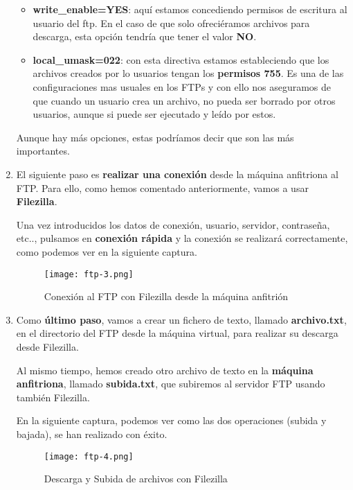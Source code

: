 \begin{enumerate}
\begin{itemize}
        \item \textbf{write\_enable=YES}: aquí estamos concediendo permisos de escritura al usuario del ftp. En el caso de que solo ofreciéramos archivos para descarga, esta opción tendría que tener el valor \textbf{NO}.

        \item \textbf{local\_umask=022}: con esta directiva estamos estableciendo que los archivos creados por lo usuarios tengan los \textbf{permisos 755}. Es una de las configuraciones mas usuales en los FTPs y con ello nos aseguramos de que cuando un usuario crea un archivo, no pueda ser borrado por otros usuarios, aunque si puede ser ejecutado y leído por estos.
    \end{itemize}

    Aunque hay más opciones, estas podríamos decir que son las más importantes.

    \item El siguiente paso es \textbf{realizar una conexión} desde la máquina anfitriona al FTP. Para ello, como hemos comentado anteriormente, vamos a usar \textbf{Filezilla}.

    Una vez introducidos los datos de conexión, usuario, servidor, contraseña, etc.., pulsamos en \textbf{conexión rápida} y la conexión se realizará correctamente, como podemos ver en la siguiente captura.

    \begin{figure}[H]
        \centering
        \texttt{[image: ftp-3.png]}
        \caption{Conexión al FTP con Filezilla desde la máquina anfitrión}
    \end{figure}

    \item Como \textbf{último paso}, vamos a crear un fichero de texto, llamado \textbf{archivo.txt}, en el directorio del FTP desde la máquina virtual, para realizar su descarga desde Filezilla.

    Al mismo tiempo, hemos creado otro archivo de texto en la \textbf{máquina anfitriona}, llamado \textbf{subida.txt}, que subiremos al servidor FTP usando también Filezilla.

    En la siguiente captura, podemos ver como las dos operaciones (subida y bajada), se han realizado con éxito.

    \begin{figure}[H]
        \centering
        \texttt{[image: ftp-4.png]}
        \caption{Descarga y Subida de archivos con Filezilla}
    \end{figure}
\end{enumerate}


